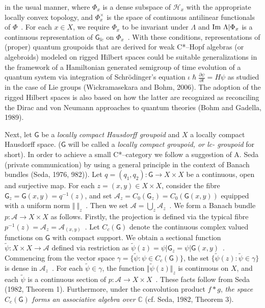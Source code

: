 \documentclass[12pt]{article}
\theoremstyle{plain}
\theoremstyle{definition}
\numberwithin{equation}{section}
\newcommand{\IM}{{\rm Im}}
\newcommand{\A}{\mathcal A}
\newcommand{\bC}{\mathbb{C}}
\newcommand{\grp}{{\mathsf{G}}}
\newcommand{\wti}{\widetilde}
\newcommand{\del}{\partial}
\newcommand{\lra}{{\longrightarrow}}
\newcommand{\<}{{\langle}}
\begin{document}
in the usual manner, where $\Phi_x$ is a dense subspace of
$\mathcal H_x$ with the appropriate locally convex topology, and
$\Phi_x^{\times}$ is the space of continuous antilinear
functionals of $\Phi$~. For each $x \in X$, we require $\Phi_x$ to
be invariant under $\Lambda$ and $\IM~ \Lambda \vert \Phi_x$ is a
continuous representation of $\grp_{lc}$ on $\Phi_x$~. With these
conditions, representations of (proper) quantum groupoids that are
derived for weak C*--Hopf algebras (or algebroids) modeled on
rigged Hilbert spaces could be suitable generalizations in the
framework of a Hamiltonian generated semigroup of time evolution
of a quantum system via integration of Schr\"odinger's equation
$\iota \hslash \frac{\del \psi}{\del t} = H \psi$ as studied in
the case of Lie groups (Wickramasekara and Bohm, 2006). The
adoption of the rigged Hilbert spaces is also based on how the
latter are recognized as reconciling the Dirac and von Neumann
approaches to quantum theories (Bohm and Gadella, 1989).

  Next, let $\grp$ be a \emph{locally compact Hausdorff groupoid} and $X$ a
locally compact Hausdorff space. ($\grp$ will be called a \emph{locally compact groupoid,
or lc- groupoid} for short). In order to achieve a small C*--category 
we follow a suggestion of A. Seda (private communication) by using a 
general principle in the context of Banach bundles (Seda, 1976, 982)). 
Let $q= (q_1, q_2) : \grp \lra X \times X$ be a continuous, open and surjective map. 
For each $z = (x,y) \in X \times X$, consider the fibre 
$\grp_z = \grp (x,y) = q^{-1}(z)$, and set $\A_z = C_0(\grp_z) = C_0(\grp(x,y))$ equipped
with a uniform norm $\Vert ~ \Vert_z$~. Then we set $\A =
\bigcup_z \A_z$~. We form a Banach bundle $p : \A \lra X \times X$
as follows. Firstly, the projection is defined via the typical
fibre $p^{-1}(z) = \A_z = \A_{(x,y)}$~. Let $C_c(\grp)$ denote the
continuous complex valued functions on $\grp$ with compact
support. We obtain a sectional function $\wti{\psi} : X \times X
\lra \A$ defined via restriction as $\wti{\psi}(z) = \psi \vert
\grp_z = \psi \vert \grp (x,y)$~. Commencing from the vector space
$\gamma = \{ \wti{\psi} : \psi \in C_c(\grp) \}$, the set $\{
\wti{\psi}(z) : \wti{\psi} \in \gamma \}$ is dense in $\A_z$~. For
each $\wti{\psi} \in \gamma$, the function $\Vert \wti{\psi} (z)
\Vert_z$ is continuous on $X$, and each $\wti{\psi}$ is a
continuous section of $p : \A \lra X \times X$~. These facts
follow from Seda (1982, Theorem 1). Furthermore, under the convolution
product $f*g$, \textit{the space $C_c(\grp)$ forms an associative algebra
over $\bC$} (cf. Seda, 1982, Theorem 3).
\end{document}

